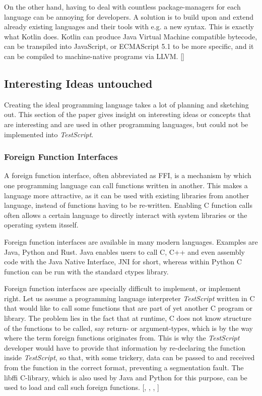 \documentclass[12pt,a4paper]{article}
\newcommand{\name}{\emph{TestScript}}
\begin{document}
On the other hand, having to deal with countless package-managers for each
language can be annoying for developers. A solution is to build upon and
extend already existing languages and their tools with e.g. a new syntax.
This is exactly what Kotlin does. Kotlin can produce Java Virtual Machine
compatible bytecode, can be transpiled into
JavaScript, or ECMAScript 5.1 to be more specific,
and it can be compiled to machine-native programs via LLVM. 
[]


\subsection{Interesting Ideas untouched}
Creating the ideal programming language takes a lot of planning and sketching
out. This section of the paper gives insight on interesting ideas or concepts
that are interesting and are used in other programming languages, but 
could not be implemented into \name{}.

\subsubsection{Foreign Function Interfaces}
A foreign function interface, often abbreviated as FFI,
is a mechanism by which one programming language can call functions written 
in another. This makes a language more attractive, as it can be used with
existing libraries from another language, instead of functions having to be
re-written. Enabling C function calls often allows a certain language to
directly interact with system libraries or the operating system itsself.

Foreign function interfaces are available in many modern languages.
Examples are Java, Python and Rust.
Java enables users to call C, C++ and even assembly code with the Java Native
Interface, JNI for short, whereas within Python C function can
be run with the standard ctypes library.

Foreign function interfaces are specially difficult to implement, or implement
right. Let us assume a programming language interpreter \name{} written in C that
would like to call some functions that are part of yet another C program or
library. The problem lies in the fact that at runtime, C does not know
structure of the functions to be called, say return- or argument-types, which
is by the way where the term foreign functions originates from. This is why the
\name{} developer would have to provide that information by re-declaring the
function inside \name{}, so that, with some trickery, data can be passed to and
received from the function in the correct format, preventing a segmentation
fault. The libffi C-library, which is also used by Java and
Python for this purpose, can be used to load and call such foreign functions.
[, , , ]
\end{document}
